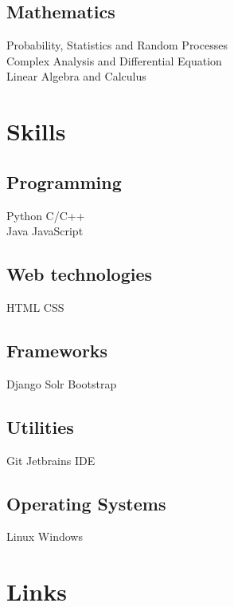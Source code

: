\documentclass[a4paper]{deedy-resume-openfont}
\begin{document}
\begin{minipage}[t]{0.36\textwidth}
\subsection{Mathematics}
Probability, Statistics and Random Processes \\
Complex Analysis and Differential Equation \\
Linear Algebra and Calculus \\
\sectionsep

\section{Skills}
\subsection{Programming}
\textbullet{} Python \textbullet{} C/C++ \\
\textbullet{} Java \textbullet{} JavaScript %
\sectionsep
\subsection{Web technologies}
\textbullet{} HTML \textbullet{} CSS \\
\sectionsep
\subsection{Frameworks}
\textbullet{} Django \textbullet{} Solr \textbullet{} Bootstrap
\sectionsep
\subsection{Utilities}
\textbullet{} Git \textbullet{} Jetbrains IDE \\
\sectionsep
\subsection{Operating Systems}
\textbullet{} Linux \textbullet{} Windows \\
\sectionsep

\section{Links} 
\sectionsep

\end{minipage} 
\end{document}
